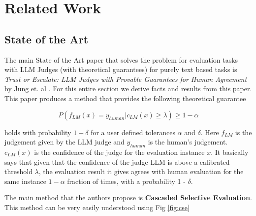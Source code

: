 \documentclass[11pt,a4paper]{article}
\begin{document}
\section{Related Work}

\subsection{State of the Art}

The main State of the Art paper that solves the problem for evaluation tasks with LLM Judges (with theoretical guarantees) for purely text based tasks is \emph{Trust or Escalate: LLM Judges with Provable Guarantees for Human Agreement} by Jung et. al \cite{jung2025trust}. For this entire section we derive facts and results from this paper. This paper produces a method that provides the following theoretical guarantee

$$
P(f_{LM}(x) = y_{human}|c_{LM}(x) \geq \lambda) \geq 1 - \alpha
$$

holds with probability $1 - \delta$ for a user defined tolerances $\alpha$ and $\delta$. Here $f_{LM}$ is the judgement given by the LLM judge and $y_{human}$ is the human's judgement. $c_{LM}(x)$ is the confidence of the judge for the evaluation instance $x$.  It basically says that given that the confidence of the judge LLM is above a calibrated threshold $\lambda$, the evaluation result it gives agrees with human evaluation for the same instance $1-\alpha$ fraction of times, with a probability 1 - $\delta$.

The main method that the authors propose is \textbf{Cascaded Selective Evaluation}. This method can be very easily understood using Fig \ref{fig:cse}
\end{document}
